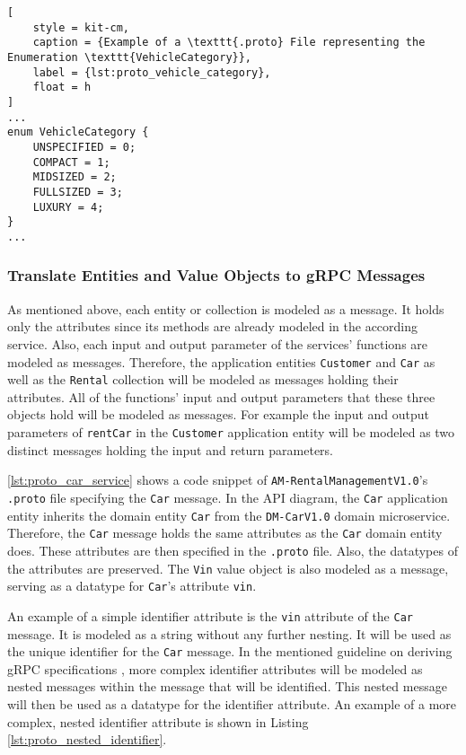 \begin{lstlisting}[
    style = kit-cm,
    caption = {Example of a \texttt{.proto} File representing the Enumeration \texttt{VehicleCategory}},
    label = {lst:proto_vehicle_category},
    float = h
]
...
enum VehicleCategory {
    UNSPECIFIED = 0;
    COMPACT = 1;
    MIDSIZED = 2;
    FULLSIZED = 3;
    LUXURY = 4;
}
...
\end{lstlisting}
\subsubsection*{Translate Entities and Value Objects to gRPC Messages}
As mentioned above, each entity or collection is modeled as a message.
It holds only the attributes since its methods are already modeled in the according service.
Also, each input and output parameter of the services' functions are modeled as messages.
Therefore, the application entities \texttt{Customer} and \texttt{Car} as well as the \texttt{Rental} collection will be modeled as messages holding their attributes.
All of the functions' input and output parameters that these three objects hold will be modeled as messages.
For example the input and output parameters of \texttt{rentCar} in the \texttt{Customer} application entity will be modeled as two distinct messages holding the input and return parameters.

\autoref{lst:proto_car_service} shows a code snippet of \texttt{AM-RentalManagementV1.0}'s \texttt{.proto} file specifying the \texttt{Car} message.
In the API diagram, the \texttt{Car} application entity inherits the domain entity \texttt{Car} from the \texttt{DM-CarV1.0} domain microservice.
Therefore, the \texttt{Car} message holds the same attributes as the \texttt{Car} domain entity does.
These attributes are then specified in the \texttt{.proto} file.
Also, the datatypes of the attributes are preserved.
The \texttt{Vin} value object is also modeled as a message, serving as a datatype for \texttt{Car}'s attribute \texttt{vin}.

An example of a simple identifier attribute is the \texttt{vin} attribute of the \texttt{Car} message.
It is modeled as a string without any further nesting.
It will be used as the unique identifier for the \texttt{Car} message.
In the mentioned guideline on deriving gRPC specifications \cite{CM-G-RPC}, more complex identifier attributes will be modeled as nested messages within the message that will be identified.
This nested message will then be used as a datatype for the identifier attribute.
An example of a more complex, nested identifier attribute is shown in Listing \autoref{lst:proto_nested_identifier}.

